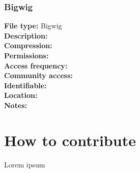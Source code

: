 \documentclass[
]{book}
\begin{document}
\hypertarget{bigwig}{%
\subsection{Bigwig}\label{bigwig}}

\textbf{File type:} Bigwig\\
\textbf{Description:}\\
\textbf{Compression:}\\
\textbf{Permissions:}\\
\textbf{Access frequency:}\\
\textbf{Community access:}\\
\textbf{Identifiable:}\\
\textbf{Location:}\\
\textbf{Notes:}

\hypertarget{how-to-contribute}{%
\chapter{How to contribute}\label{how-to-contribute}}

Lorem ipsum

  
\end{document}
